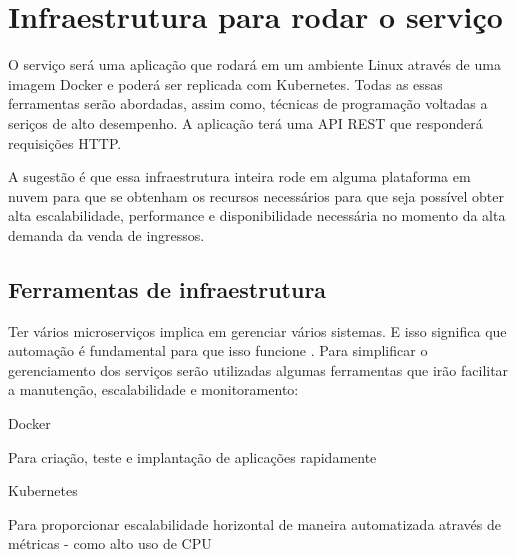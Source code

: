 \section{Infraestrutura para rodar o serviço}

O serviço será uma aplicação que rodará em um ambiente Linux através
de uma imagem Docker e poderá ser replicada com Kubernetes. Todas as essas ferramentas
serão abordadas, assim como, técnicas de programação voltadas a seriços de alto
desempenho. A aplicação terá uma API REST que responderá requisições HTTP.

A sugestão é que essa infraestrutura inteira rode em alguma plataforma em nuvem para
que se obtenham os recursos necessários para que seja possível obter alta escalabilidade,
performance e disponibilidade necessária no momento da alta demanda da venda de ingressos.

\subsection{Ferramentas de infraestrutura}

Ter vários microserviços implica em gerenciar
vários sistemas. E isso significa que automação é fundamental para que isso funcione
\cite{martin-fowler-microservices}.
Para simplificar o gerenciamento dos serviços serão utilizadas algumas ferramentas que
irão facilitar a manutenção, escalabilidade e monitoramento:

\begin{alineas}

  \item Docker

  \begin{alineas}
     \item Para criação, teste e implantação de aplicações rapidamente \cite{aws-o-que-e-o-docker}
  \end{alineas}

  \item Kubernetes

  \begin{alineas}
     \item Para proporcionar escalabilidade horizontal de maneira automatizada através de métricas
           - como alto uso de CPU \cite{kubernetes-horizontal-pod-autoscaling}
  \end{alineas}

\end{alineas}

